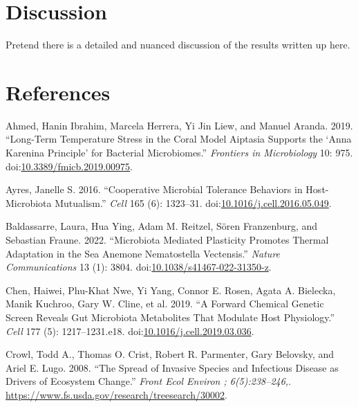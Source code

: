 \documentclass[
]{article}
\newlength{\cslhangindent}
\newlength{\cslentryspacingunit} %
\newenvironment{CSLReferences}[2] %
 {%
  \setlength{\parindent}{0pt}
  \ifodd #1
  \let\oldpar\par
  \def\par{\hangindent=\cslhangindent\oldpar}
  \fi
  \setlength{\parskip}{#2\cslentryspacingunit}
 }%
 {}
\begin{document}
\hypertarget{discussion}{%
\section{Discussion}\label{discussion}}

Pretend there is a detailed and nuanced discussion of the results
written up here.

\hypertarget{references}{%
\section*{References}\label{references}}

\hypertarget{refs}{}
\begin{CSLReferences}{1}{0}
\leavevmode{}%
Ahmed, Hanin Ibrahim, Marcela Herrera, Yi Jin Liew, and Manuel Aranda.
2019. {``Long-Term Temperature Stress in the Coral Model Aiptasia
Supports the {`Anna Karenina Principle'} for Bacterial Microbiomes.''}
\emph{Frontiers in Microbiology} 10: 975.
doi:\href{https://doi.org/10.3389/fmicb.2019.00975}{10.3389/fmicb.2019.00975}.

\leavevmode{}%
Ayres, Janelle S. 2016. {``Cooperative Microbial Tolerance Behaviors in
Host-Microbiota Mutualism.''} \emph{Cell} 165 (6): 1323--31.
doi:\href{https://doi.org/10.1016/j.cell.2016.05.049}{10.1016/j.cell.2016.05.049}.

\leavevmode{}%
Baldassarre, Laura, Hua Ying, Adam M. Reitzel, Sören Franzenburg, and
Sebastian Fraune. 2022. {``Microbiota Mediated Plasticity Promotes
Thermal Adaptation in the Sea Anemone Nematostella Vectensis.''}
\emph{Nature Communications} 13 (1): 3804.
doi:\href{https://doi.org/10.1038/s41467-022-31350-z}{10.1038/s41467-022-31350-z}.

\leavevmode{}%
Chen, Haiwei, Phu-Khat Nwe, Yi Yang, Connor E. Rosen, Agata A. Bielecka,
Manik Kuchroo, Gary W. Cline, et al. 2019. {``A Forward Chemical Genetic
Screen Reveals Gut Microbiota Metabolites That Modulate Host
Physiology.''} \emph{Cell} 177 (5): 1217--1231.e18.
doi:\href{https://doi.org/10.1016/j.cell.2019.03.036}{10.1016/j.cell.2019.03.036}.

\leavevmode{}%
Crowl, Todd A., Thomas O. Crist, Robert R. Parmenter, Gary Belovsky, and
Ariel E. Lugo. 2008. {``The Spread of Invasive Species and Infectious
Disease as Drivers of Ecosystem Change.''} \emph{Front Ecol Environ ;
6(5):238--246,}.
\url{https://www.fs.usda.gov/research/treesearch/30002}.


\end{CSLReferences}
\end{document}
